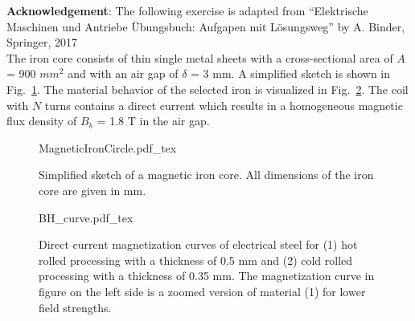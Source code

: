 

\normalsize{\textbf{Acknowledgement}: The following exercise is adapted from ``Elektrische Maschinen und Antriebe Übungsbuch: Aufgapen mit Lösungsweg'' by A. Binder, Springer, 2017}\\




The iron core consists of thin single metal sheets with a cross-sectional area of $A$ = 900 $\si{mm}^2$ and with an air gap of $\delta$ = 3 mm. A simplified sketch is shown in Fig.~\ref{fig:MagneticIronCircle}. The material behavior of the selected iron is visualized in Fig.~\ref{fig:BH_curve}. The coil with $N$ turns contains a direct current which results in a homogeneous magnetic flux density of $B_{\mathrm{\delta}}$ = 1.8 T in the air gap.


\begin{figure}[htb]
    \centering
    {MagneticIronCircle.pdf_tex}
    \caption{Simplified sketch of a magnetic iron core. All dimensions of the iron core are given in mm.}
    \label{fig:MagneticIronCircle}
\end{figure}

\begin{figure}[htb]
    \centering
    {BH_curve.pdf_tex}
    \caption{Direct current magnetization curves of electrical steel for (1) hot rolled processing with a thickness of 0.5 mm and (2) cold rolled processing with a thickness of 0.35 mm. The magnetization curve in figure on the left side is a zoomed version of material (1) for lower field strengths.}
    \label{fig:BH_curve}
\end{figure}



